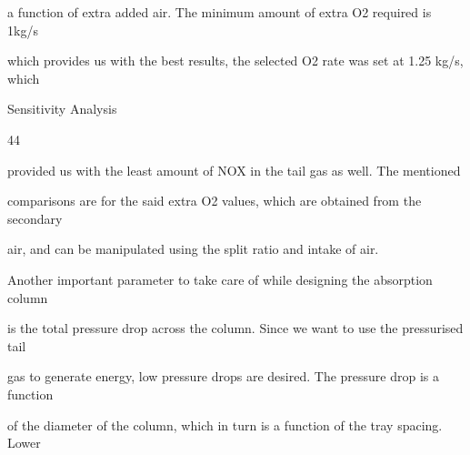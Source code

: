 \documentclass[a4paper,portrait,12pt]{article}
\begin{document}
\begin{flushleft}
a function of extra added air. The minimum amount of extra O2 required is 1kg/s
\end{flushleft}


\begin{flushleft}
which provides us with the best results, the selected O2 rate was set at 1.25 kg/s, which
\end{flushleft}





\begin{flushleft}
\newpage
Sensitivity Analysis
\end{flushleft}





44





\begin{flushleft}
provided us with the least amount of NOX in the tail gas as well. The mentioned
\end{flushleft}


\begin{flushleft}
comparisons are for the said extra O2 values, which are obtained from the secondary
\end{flushleft}


\begin{flushleft}
air, and can be manipulated using the split ratio and intake of air.
\end{flushleft}





\begin{flushleft}
Another important parameter to take care of while designing the absorption column
\end{flushleft}


\begin{flushleft}
is the total pressure drop across the column. Since we want to use the pressurised tail
\end{flushleft}


\begin{flushleft}
gas to generate energy, low pressure drops are desired. The pressure drop is a function
\end{flushleft}


\begin{flushleft}
of the diameter of the column, which in turn is a function of the tray spacing. Lower
\end{flushleft}
\end{document}

